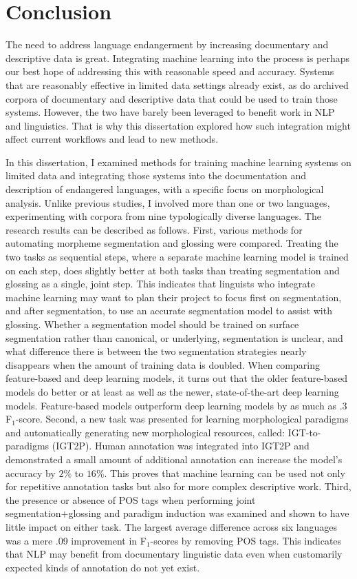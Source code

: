 \chapter{Conclusion}
\label{chap:conclusion}

The need to address language endangerment by increasing documentary and descriptive data is great. Integrating machine learning into the process is perhaps our best hope of addressing this with reasonable speed and accuracy. Systems that are reasonably effective in limited data settings already exist, as do archived corpora of documentary and descriptive data that could be used to train those systems. However, the two have barely been leveraged to benefit work in NLP and linguistics. That is why this dissertation explored how such integration might affect current workflows and lead to new methods. 

In this dissertation, I examined methods for training machine learning systems on limited data and integrating those systems into the documentation and description of endangered languages, with a specific focus on morphological analysis. Unlike previous studies, I involved more than one or two languages, experimenting with corpora from nine typologically diverse languages. The research results can be described as follows. First, various methods for automating morpheme segmentation and glossing were compared. Treating the two tasks as sequential steps, where a separate machine learning model is trained on each step, does slightly better at both tasks than treating segmentation and glossing as a single, joint step. This indicates that linguists who integrate machine learning may want to plan their project to focus first on segmentation, and after segmentation, to use an accurate segmentation model to assist with glossing. 
Whether a segmentation model should be trained on surface segmentation rather than canonical, or underlying, segmentation is unclear, and what difference there is between the two segmentation strategies nearly disappears when the amount of training data is doubled. 
When comparing feature-based and deep learning  models, it turns out that the older feature-based models do better or at least as well as the newer, state-of-the-art deep learning models. Feature-based models outperform deep learning models by as much as .3 F$_1$-score.
Second, a new task was presented for learning morphological paradigms and automatically generating new morphological resources, called: IGT-to-paradigms (IGT2P). Human annotation was integrated into IGT2P and demonstrated a small amount of additional annotation can increase the model's accuracy by $2\%$ to $16\%$. This proves that machine learning can be used not only for repetitive annotation tasks but also for more complex descriptive work. 
Third, the presence or absence of POS tags when performing joint segmentation+glossing and paradigm induction was examined and shown to have little impact on either task. The largest average difference across six languages was a mere .09 improvement in F$_1$-scores by removing POS tags. This indicates that NLP may benefit from documentary linguistic data even when customarily expected kinds of annotation do not yet exist.

